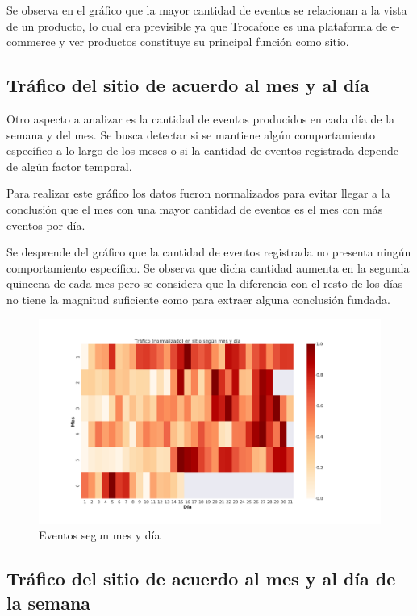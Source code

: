 \documentclass[a4paper]{article}
\begin{document}
Se observa en el gráfico que la mayor cantidad de eventos se relacionan a la vista de un producto, lo cual era previsible ya que Trocafone es una plataforma de e-commerce y ver productos constituye su principal función como sitio.

\subsection{Tráfico del sitio de acuerdo al mes y al día}

Otro aspecto a analizar es la cantidad de eventos producidos en cada día de la semana y del mes. Se busca detectar si se mantiene algún comportamiento específico a lo largo de los meses o si la cantidad de eventos registrada depende de algún factor temporal.

Para realizar este gráfico los datos fueron normalizados para evitar llegar a la conclusión que el mes con una mayor cantidad de eventos es el mes con más eventos por día. 

Se desprende del gráfico que la cantidad de eventos registrada no presenta ningún comportamiento específico. Se observa que dicha cantidad aumenta en la segunda quincena de cada mes pero se considera que la diferencia con el resto de los días no tiene la magnitud suficiente como para extraer alguna conclusión fundada. 

\begin{figure}[h!]
	\includegraphics[width=\linewidth]{figures/030-eventos_segun_mes-heatmap.png}
	\caption{Eventos segun mes y día}
	\label{fig:mesdiasnormalizado}
\end{figure}

\subsection{Tráfico del sitio de acuerdo al mes y al día de la semana}
\end{document}
